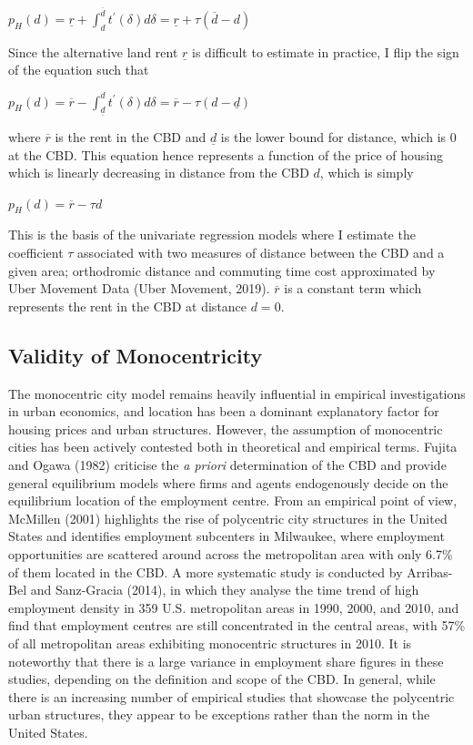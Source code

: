 \documentclass{article}
\begin{document}
\begin{center}
$p _ { H } ( d ) = \underline { r } + \int _ { d } ^ { \overline { d } } t ^ { \prime } ( \delta ) d \delta = \underline { r } + \tau ( \overline { d } - d )$
\end{center}
Since the alternative land rent $\underline{r}$ is difficult to estimate in practice, I flip the sign of the equation such that 
\begin{center}
$p _ { H } ( d ) = \overline { r } - \int _ { \underline { d } } ^ { d } t ^ { \prime } ( \delta ) d \delta = \overline { r } - \tau ( d - \underline { d } )$
\end{center}
where $\overline{r}$ is the rent in the CBD and $\underline{d}$ is the lower bound for distance, which is 0 at the CBD. This equation hence represents a function of the price of housing which is linearly decreasing in distance from the CBD $d$, which is simply
\begin{center}
$p _ { H } ( d ) = \overline { r } - \tau d$
\end{center}
This is the basis of the univariate regression models where I estimate the coefficient $\tau$ associated with two measures of distance between the CBD and a given area; orthodromic distance and commuting time cost approximated by Uber Movement Data (Uber Movement, 2019). $\overline{r}$ is a constant term which represents the rent in the CBD at distance $d = 0$.

\subsection{Validity of Monocentricity} \label{subsection:monocentricity}
The monocentric city model remains heavily influential in empirical investigations in urban economics, and location has been a dominant explanatory factor for housing prices and urban structures. However, the assumption of monocentric cities has been actively contested both in theoretical and empirical terms. Fujita and Ogawa (1982) criticise the \textit{a priori} determination of the CBD and provide general equilibrium models where firms and agents endogenously decide on the equilibrium location of the employment centre.
From an empirical point of view, McMillen (2001) highlights the rise of polycentric city structures in the United States and identifies employment subcenters in Milwaukee, where employment opportunities are scattered around across the metropolitan area with only 6.7\% of them located in the CBD. A more systematic study is conducted by Arribas-Bel and Sanz-Gracia (2014), in which they analyse the time trend of high employment density in 359 U.S. metropolitan areas in 1990, 2000, and 2010, and find that employment centres are still concentrated in the central areas, with 57\% of all metropolitan areas exhibiting monocentric structures in 2010. It is noteworthy that there is a large variance in employment share figures in these studies, depending on the definition and scope of the CBD. In general, while there is an increasing number of empirical studies that showcase the polycentric urban structures, they appear to be exceptions rather than the norm in the United States.
\end{document}
